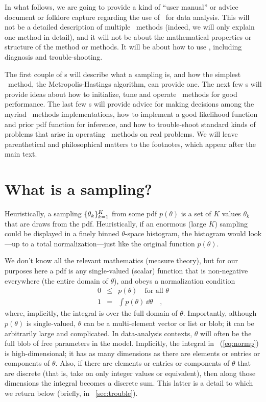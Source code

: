 \documentclass[modern]{aastex61}
\newcommand{\MCMC}{\acronym{MCMC}}
\newcommand{\pars}{\theta}
\begin{document}
In what follows, we are going to provide a kind of ``user manual'' or
advice document or folklore capture regarding the use of \MCMC\ for
data analysis.
This will not be a detailed description of multiple \MCMC\ methods
(indeed, we will only explain one method in detail), and it will not
be about the mathematical properties or structure of the method or
methods.
It will be about how to use \MCMC, including diagnosis and
trouble-shooting.

The first couple of \sectionname s will describe what a sampling is, and how
the simplest \MCMC\ method, the Metropolis-Hastings algorithm, can
provide one.
The next few \sectionname s will provide ideas about how to
initialize, tune and operate \MCMC\ methods for good performance.
The last few \sectionname s will provide advice for making decisions
among the myriad \MCMC\ methods implementations, how to implement a good
likelihood function and prior pdf function for inference, and how to
trouble-shoot standard kinds of problems that arise in operating \MCMC\
methods on real problems.
We will leave parenthetical and philosophical matters to the footnotes,
which appear after the main text.

\section{What is a sampling?}\label{sec:sampling}
\nopagebreak
Heuristically, a sampling $\setof{\pars_k}_{k=1}^K$ from some pdf $p(\pars)$
is a set of $K$ values $\pars_k$ that are draws from the pdf.
Heuristically, if an enormous (large $K$) sampling could be displayed
in a finely binned $\pars$-space histogram, the histogram would look---up
to a total normalization---just like the original function $p(\pars)$.

We don't know all the relevant mathematics (measure theory),
but for our purposes here a pdf is
any single-valued (scalar) function that is non-negative everywhere
(the entire domain of $\pars$), and obeys a normalization condition
\begin{eqnarray}
0 &\leq& p(\pars) \quad \mbox{for all $\pars$}
\\ \label{eq:normp}
1 &=& \int p(\pars)\,\dd\pars
\quad ,
\end{eqnarray}
where, implicitly, the integral is over the full domain of $\pars$.
Importantly, although $p(\pars)$ is single-valued, $\pars$ can be
a multi-element vector or list or blob; it can be arbitrarily large
and complicated.
In data-analysis contexts, $\pars$ will often be the full blob of free
parameters in the model.
Implicitly, the integral in \equationname~(\ref{eq:normp}) is high-dimensional; it
has as many dimensions as there are elements or entries or components of $\pars$.
Also, if there are elements or entries or components of $\pars$ that are discrete
(that is, take on only integer values or equivalent),
then along those dimensions the integral becomes a discrete sum.
This latter is a detail to which we return below (briefly, in
  \sectionname~\ref{sec:trouble}).
\end{document}
